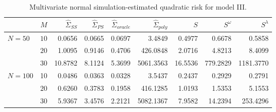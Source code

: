 %
%
\begin{table}[H]
\centering
\caption{Multivariate normal simulation-estimated quadratic risk  for model III.} 
\begin{tabular}{lrrrrrrrr}
  & $M$ &$\hat{\Sigma}_{SS}$& $\hat{\Sigma}_{PS}$ &$\hat{\Sigma}_{oracle}$& $\hat{\Sigma}_{poly}$ & $S$ &$S^\omega$& $S^\lambda$ \\ 
  \hline
$N = 50$ & $10$ & 0.0656 & 0.0665 & 0.0697 & 3.4849 & 0.4977 & 0.6678 & 0.5858 \\ 
    &    $20$ & 1.0095 & 0.9146 & 0.4706 & 426.0848 & 2.0716 & 4.8213 & 8.4099 \\ 
    &    $30$ & 10.8782 & 8.1124 & 5.3699 & 5061.3563 & 16.5536 & 779.2829 & 1181.3770 \\ 
     $N = 100$ & 10 & 0.0486 & 0.0363 & 0.0328 & 3.5437 & 0.2437 & 0.2929 & 0.2791 \\ 
     & $20$ & 0.6260 & 0.3783 & 0.1958 & 416.1285 & 1.0193 & 1.5353 & 5.1553 \\ 
     & $30$ & 5.9367 & 3.4576 & 2.2121 & 5082.1367 & 7.9582 & 14.2394 & 253.4296 \\ 
       \hline
\end{tabular}
\label{table:simulation-1-quad-loss-sigma-3}
\end{table}
%

